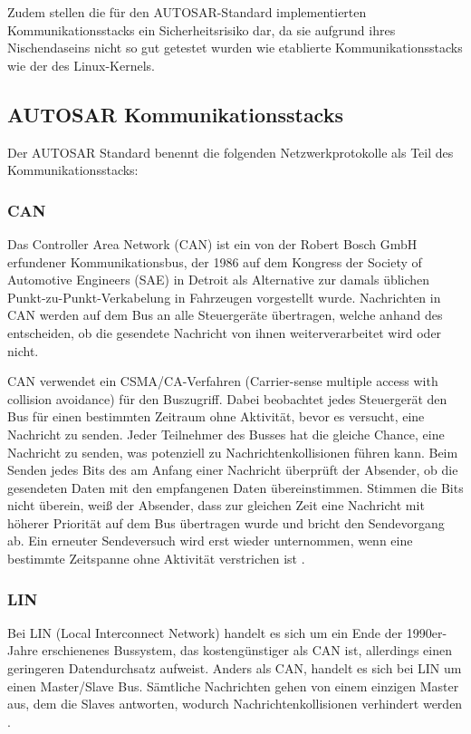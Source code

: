 Zudem stellen die für den AUTOSAR-Standard implementierten Kommunikationsstacks ein Sicherheitsrisiko dar, da sie aufgrund ihres Nischendaseins nicht so gut getestet wurden wie etablierte Kommunikationsstacks wie der des Linux-Kernels. 

\subsection{AUTOSAR Kommunikationsstacks}\label{subsec:kommunikationsstacks}

Der AUTOSAR Standard benennt die folgenden Netzwerkprotokolle als Teil des Kommunikationsstacks:

\subsubsection{CAN}\label{subsec:can}

Das Controller Area Network (CAN) ist ein von der Robert Bosch GmbH erfundener Kommunikationsbus, der 1986 auf dem Kongress der Society of Automotive Engineers (SAE) in Detroit als Alternative zur damals üblichen Punkt-zu-Punkt-Verkabelung in Fahrzeugen vorgestellt wurde. Nachrichten in CAN werden auf dem Bus an alle Steuergeräte übertragen, welche anhand des  entscheiden, ob die gesendete Nachricht von ihnen weiterverarbeitet wird oder nicht.

CAN verwendet ein CSMA/CA-Verfahren (Carrier-sense multiple access with collision avoidance) für den Buszugriff. Dabei beobachtet jedes Steuergerät den Bus für einen bestimmten Zeitraum ohne Aktivität, bevor es versucht, eine Nachricht zu senden. Jeder Teilnehmer des Busses hat die gleiche Chance, eine Nachricht zu senden, was potenziell zu Nachrichtenkollisionen führen kann. Beim Senden jedes Bits des  am Anfang einer Nachricht überprüft der Absender, ob die gesendeten Daten mit den empfangenen Daten übereinstimmen. Stimmen die Bits nicht überein, weiß der Absender, dass zur gleichen Zeit eine Nachricht mit höherer Priorität auf dem Bus übertragen wurde und bricht den Sendevorgang ab. Ein erneuter Sendeversuch wird erst wieder unternommen, wenn eine bestimmte Zeitspanne ohne Aktivität verstrichen ist \cite[S. 57]{bussyteme}.

\subsubsection{LIN}\label{subsec:LIN}

Bei LIN (Local Interconnect Network) handelt es sich um ein Ende der 1990er-Jahre erschienenes Bussystem, das kostengünstiger als CAN ist, allerdings einen geringeren Datendurchsatz aufweist. Anders als CAN, handelt es sich bei LIN um einen Master/Slave Bus. Sämtliche Nachrichten gehen von einem einzigen Master aus, dem die Slaves antworten, wodurch Nachrichtenkollisionen verhindert werden \cite[S. 79]{bussyteme}.

